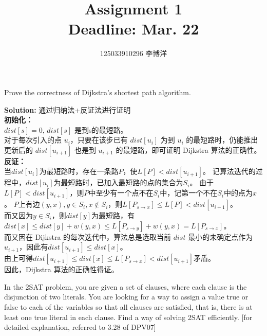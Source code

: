 \documentclass{article}
\title{{\bf Assignment 1} \\ {\large Deadline: Mar. 22}}
\author{125033910296 李博洋}
\date{}
\newcounter{exercise}
\newcommand{\solution}{
    \vspace{0.2in}
    \noindent
    {\bf Solution:}
    }
\newcommand{\<}{
    \langle}
\renewcommand{\>}{
    \rangle}
\begin{document}
\maketitle


{\large


\begin{exercise}
Prove the correctness of Dijkstra's shortest path algorithm.
\end{exercise}

\solution{
通过归纳法+反证法进行证明\\
\textbf{初始化：}\\
$dist[s] = 0$, $dist[s]$ 是到s的最短路。\\
对于每次引入的点 $u_i$，只要在该步已有 $dist[u_i]$ 为到 $u_i$ 的最短路时，仍能推出更新后的 $dist[u_{i+1}]$ 也是到 $u_{i+1}$ 的最短路，即可证明 Dijkstra 算法的正确性。\\
\textbf{反证：}\\
当$dist[u_i]$为最短路时，存在一条路$P$，使$L[P] < dist[u_{i+1}]$。
记算法迭代的过程中，$dist[u_i]$为最短路时，已加入最短路的点的集合为$S_i$。
由于$L[P] < dist[u_{i+1}]$，则$P$中至少有一个点不在$S_i$中，记第一个不在$S_i$中的点为$x$。
$P$上有边$(y, x), y \in S_i, x \notin S_i$，则$L[P_{s \to x}] \leq L[P] < dist[u_{i+1}]$。\\
而又因为$y \in S_i$，则$dist[y]$为最短路，有
$dist[x] \leq dist[y] + w(y, x) \leq L[P_{s \to y}] + w(y, x) = L[P_{s \to x}]$。\\
而又因在 Dijkstra 的每次迭代中，算法总是选取当前 $dist$ 最小的未确定点作为 $u_{i+1}$，因此有$dist[u_{i+1}] \leq dist[x]$。\\
由上可得$dist[u_{i+1}] \leq dist[x] \leq L[P_{s \to x}] < dist[u_{i+1}]$矛盾。\\
因此，Dijkstra 算法的正确性得证。
}


\begin{exercise}
In the 2SAT problem, you are given a set of clauses, where each clause is the disjunction of two literals. 
You are looking for a way to assign a value true or false to each of the variables so that all clauses are satisfied, 
that is, there is at least one true literal in each clause. Find a way of solving 2SAT efficiently.
[for detailed explanation, referred to 3.28 of DPV07]
\end{exercise}

}
\end{document}
